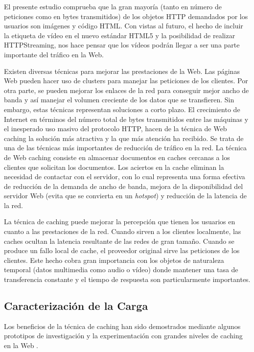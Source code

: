 \documentclass[twocolumn]{Jornadas}
\begin{document}
El presente estudio comprueba que la gran mayoría (tanto en número de peticiones como en bytes transmitidos) de los objetos HTTP demandados por los usuarios son imágenes y código HTML. Con vistas al futuro, el hecho de incluir la etiqueta de vídeo en el nuevo estándar HTML5 y la posibilidad de realizar HTTPStreaming, nos hace pensar que los vídeos podrán llegar a ser una parte importante del tráfico en la Web.

Existen diversas técnicas para mejorar las prestaciones de la Web. Las páginas Web pueden hacer uso de clusters para manejar las peticiones de los clientes. Por otra parte, se pueden mejorar los enlaces de la red para conseguir mejor ancho de banda y así manejar el volumen creciente de los datos que se transfieren. Sin embargo, estas técnicas representan soluciones a corto plazo. El crecimiento de Internet en términos del número total de bytes transmitidos entre las máquinas y el inesperado uso masivo del protocolo HTTP, hacen de la técnica de Web caching la solución más atractiva y la que más atención ha recibido. Se trata de una de las técnicas más importantes de reducción de tráfico en la red. La técnica de Web caching consiste en almacenar documentos en caches cercanas a los clientes que solicitan los documentos. Los aciertos en la cache eliminan la necesidad de contactar con el servidor, con lo cual representa una forma efectiva de reducción de la demanda de ancho de banda, mejora de la disponibilidad del servidor Web (evita que se convierta en un \emph{hotspot}) y reducción de la latencia de la red.

La técnica de caching puede mejorar la percepción que tienen los usuarios en cuanto a las prestaciones de la red. Cuando sirven a los clientes localmente, las caches ocultan la latencia resultante de las redes de gran tamaño. Cuando se produce un fallo local de cache, el proveedor original sirve las peticiones de los clientes.
Este hecho cobra gran importancia con los objetos de naturaleza temporal (datos multimedia como audio o vídeo) donde mantener una tasa de transferencia constante y el tiempo de respuesta son particularmente importantes.

\subsection{Caracterización de la Carga}
Los beneficios de la técnica de caching han sido demostrados mediante algunos prototipos de investigación y la experimentación con grandes niveles de caching en la Web \cite{squid}. 
\end{document}
